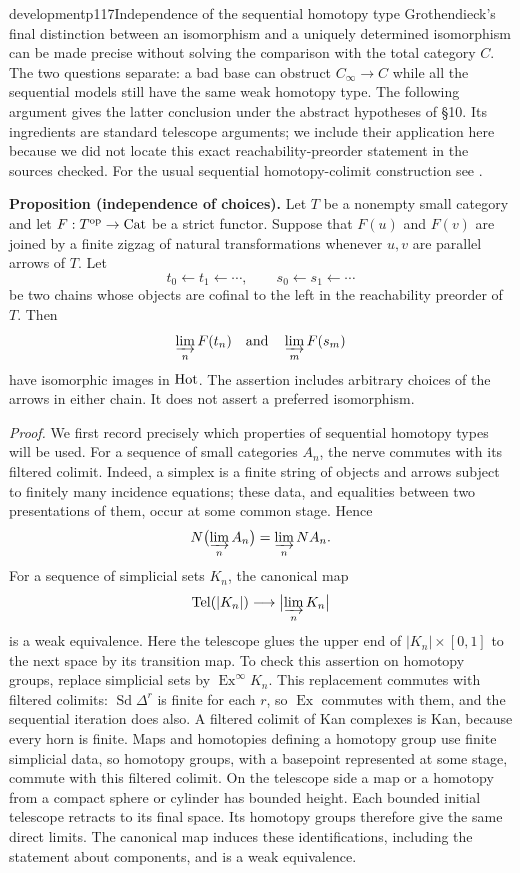 \begin{dcomment}{development}{p117}{Independence of the sequential homotopy type}
Grothendieck's final distinction between an isomorphism and a uniquely determined isomorphism can be made precise without solving the comparison with the total category $C$.  The two questions separate: a bad base can obstruct $C_\infty\to C$ while all the sequential models still have the same weak homotopy type.  The following argument gives the latter conclusion under the abstract hypotheses of \S10.  Its ingredients are standard telescope arguments; we include their application here because we did not locate this exact reachability-preorder statement in the sources checked.  For the usual sequential homotopy-colimit construction see \citet[\S14.9, Proposition~14.10 and Corollary~14.11]{DuggerHocolim}.

\textbf{Proposition (independence of choices).}\ours\quad
Let $T$ be a nonempty small category and let $F:T^{\mathrm{op}}\to\mathrm{Cat}$ be a strict functor.  Suppose that $F(u)$ and $F(v)$ are joined by a finite zigzag of natural transformations whenever $u,v$ are parallel arrows of $T$.  Let
\[
 t_0\longleftarrow t_1\longleftarrow\cdots,
 \qquad s_0\longleftarrow s_1\longleftarrow\cdots
\]
be two chains whose objects are cofinal to the left in the reachability preorder of $T$.  Then
\[
 \varinjlim_n F(t_n)\quad\hbox{and}\quad\varinjlim_m F(s_m)
\]
have isomorphic images in $\mathrm{Hot}$.  The assertion includes arbitrary choices of the arrows in either chain.  It does not assert a preferred isomorphism.

\textit{Proof.}
We first record precisely which properties of sequential homotopy types will be used.  For a sequence of small categories $A_n$, the nerve commutes with its filtered colimit.  Indeed, a simplex is a finite string of objects and arrows subject to finitely many incidence equations; these data, and equalities between two presentations of them, occur at some common stage.  Hence
\[
 N\bigl(\varinjlim_n A_n\bigr)=\varinjlim_n N A_n.
\]
For a sequence of simplicial sets $K_n$, the canonical map
\[
 \operatorname{Tel}(|K_n|)\longrightarrow
       \bigl|\varinjlim_n K_n\bigr|
\]
is a weak equivalence.  Here the telescope glues the upper end of
$|K_n|\times[0,1]$ to the next space by its transition map.  To check this assertion on homotopy groups, replace simplicial sets by $\operatorname{Ex}^{\infty}K_n$.  This replacement commutes with filtered colimits: $\operatorname{Sd}\Delta^r$ is finite for each $r$, so $\operatorname{Ex}$ commutes with them, and the sequential iteration does also.  A filtered colimit of Kan complexes is Kan, because every horn is finite.  Maps and homotopies defining a homotopy group use finite simplicial data, so homotopy groups, with a basepoint represented at some stage, commute with this filtered colimit.  On the telescope side a map or a homotopy from a compact sphere or cylinder has bounded height.  Each bounded initial telescope retracts to its final space.  Its homotopy groups therefore give the same direct limits.  The canonical map induces these identifications, including the statement about components, and is a weak equivalence.


\end{dcomment}
